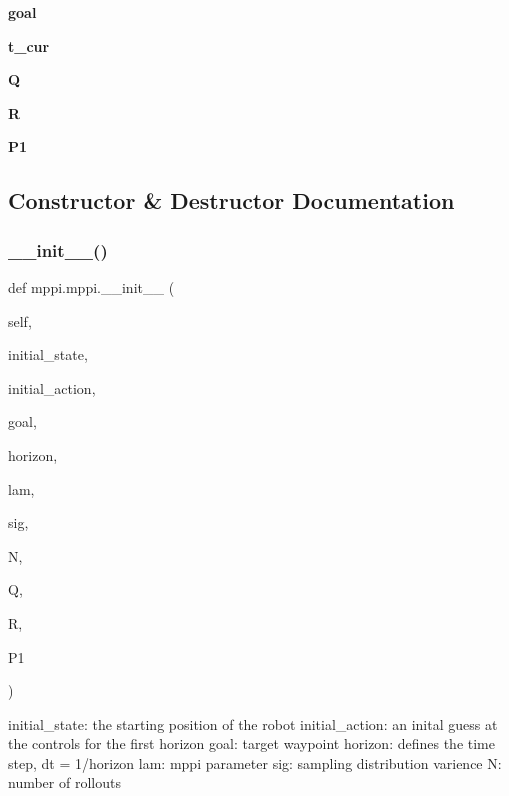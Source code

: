 \begin{DoxyCompactItemize}
{\bfseries goal}
\item 
\mbox{\label{classmppi_1_1mppi_ac0ce5467b9850d5d1b04fb3d6c939f9a}} 
{\bfseries t\+\_\+cur}
\item 
\mbox{\label{classmppi_1_1mppi_af94490dc621ccab0958c4fff71c197b0}} 
{\bfseries Q}
\item 
\mbox{\label{classmppi_1_1mppi_ae8cb78644a438cb735817c790d7ed21d}} 
{\bfseries R}
\item 
\mbox{\label{classmppi_1_1mppi_a08990f801950f176c951cafd01e06ad9}} 
{\bfseries P1}
\end{DoxyCompactItemize}


\subsection{Constructor \& Destructor Documentation}
\mbox{\label{classmppi_1_1mppi_ae70b7800222b3d3fa78a5c971379a7ce}} 
\subsubsection{\texorpdfstring{\+\_\+\+\_\+init\+\_\+\+\_\+()}{\_\_init\_\_()}}
{\footnotesize\ttfamily def mppi.\+mppi.\+\_\+\+\_\+init\+\_\+\+\_\+ (\begin{DoxyParamCaption}\item[{}]{self,  }\item[{}]{initial\+\_\+state,  }\item[{}]{initial\+\_\+action,  }\item[{}]{goal,  }\item[{}]{horizon,  }\item[{}]{lam,  }\item[{}]{sig,  }\item[{}]{N,  }\item[{}]{Q,  }\item[{}]{R,  }\item[{}]{P1 }\end{DoxyParamCaption})}

\begin{DoxyVerb}initial_state: the starting position of the robot
initial_action: an inital guess at the controls for the first horizon
goal: target waypoint
horizon: defines the time step, dt = 1/horizon
lam: mppi parameter
sig: sampling distribution varience
N: number of rollouts
\end{DoxyVerb}
 


